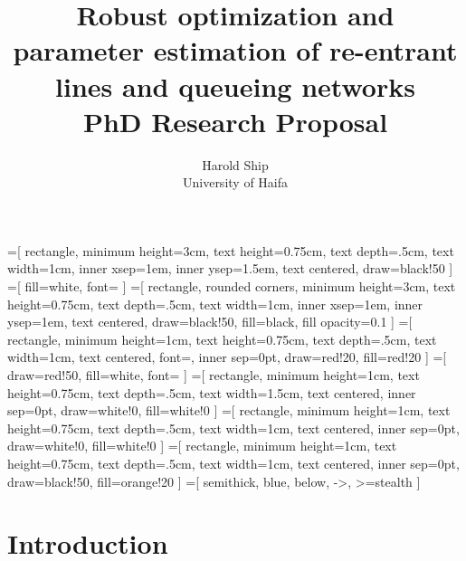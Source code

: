 \documentclass[11pt,a4paper,titlepage]{article}
\title{Robust optimization and parameter estimation of re-entrant lines and
    queueing networks \\ PhD Research Proposal}
\author{Harold Ship \\ University of Haifa}
\theoremstyle{definition}
\theoremstyle{plain}
\begin{document}
=[%
rectangle,
minimum height=3cm,
text height=0.75cm,
text depth=.5cm,
text width=1cm,
inner xsep=1em,
inner ysep=1.5em,
text centered,
draw=black!50
]
=[%
fill=white,
font=\scriptsize
]
=[%
rectangle,
rounded corners,
minimum height=3cm,
text height=0.75cm,
text depth=.5cm,
text width=1cm,
inner xsep=1em,
inner ysep=1em,
text centered,
draw=black!50,
fill=black,
fill opacity=0.1
]
=[%
rectangle,
minimum height=1cm,
text height=0.75cm,
text depth=.5cm,
text width=1cm,
text centered,
font=\scriptsize,
inner sep=0pt,
draw=red!20,
fill=red!20
]
=[%
draw=red!50,
fill=white,
font=\tiny
]
=[%
rectangle,
minimum height=1cm,
text height=0.75cm,
text depth=.5cm,
text width=1.5cm,
text centered,
inner sep=0pt,
draw=white!0,
fill=white!0
]
=[%
rectangle,
minimum height=1cm,
text height=0.75cm,
text depth=.5cm,
text width=1cm,
text centered,
inner sep=0pt,
draw=white!0,
fill=white!0
]
=[%
rectangle,
minimum height=1cm,
text height=0.75cm,
text depth=.5cm,
text width=1cm,
text centered,
inner sep=0pt,
draw=black!50,
fill=orange!20
]
=[%
semithick,
blue,
below,
->,
>=stealth
]



\maketitle \clearpage
\tableofcontents \clearpage
\iffalse %
\listoffigures \clearpage
\fi
\iffalse %
\listoftables \clearpage
\fi
\printglossaries \clearpage


\setcounter{page}{1}


\section{Introduction}
\label{sec:introduction}
\end{document}

